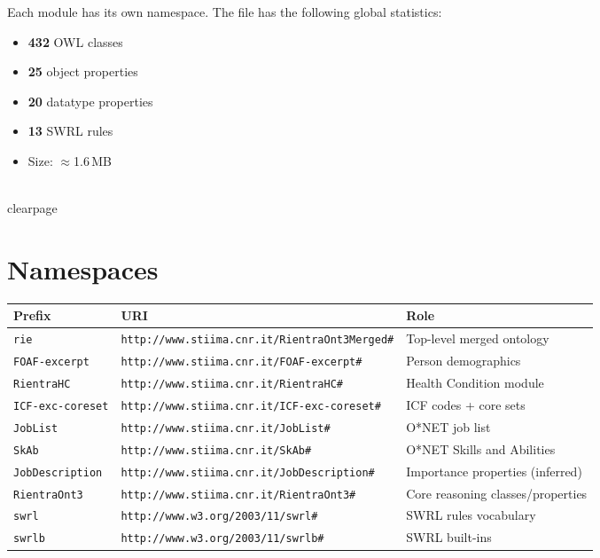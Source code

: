 ﻿\documentclass[12pt,a4paper]{article}
\begin{document}
\noindent Each module has its own namespace. The file has the following global statistics:
\begin{itemize}
  \item \textbf{432} OWL classes
  \item \textbf{25} object properties
  \item \textbf{20} datatype properties
  \item \textbf{13} SWRL rules
  \item Size: $\approx$1.6\,MB
\end{itemize}

\\clearpage
\section{Namespaces}

\begin{longtable}{@{}lll@{}}
\toprule
\textbf{Prefix} & \textbf{URI} & \textbf{Role} \\
\midrule
\endhead
\texttt{rie} & \texttt{http://www.stiima.cnr.it/RientraOnt3Merged\#} & Top-level merged ontology \\
\texttt{FOAF-excerpt} & \texttt{http://www.stiima.cnr.it/FOAF-excerpt\#} & Person demographics \\
\texttt{RientraHC} & \texttt{http://www.stiima.cnr.it/RientraHC\#} & Health Condition module \\
\texttt{ICF-exc-coreset} & \texttt{http://www.stiima.cnr.it/ICF-exc-coreset\#} & ICF codes + core sets \\
\texttt{JobList} & \texttt{http://www.stiima.cnr.it/JobList\#} & O*NET job list \\
\texttt{SkAb} & \texttt{http://www.stiima.cnr.it/SkAb\#} & O*NET Skills and Abilities \\
\texttt{JobDescription} & \texttt{http://www.stiima.cnr.it/JobDescription\#} & Importance properties (inferred) \\
\texttt{RientraOnt3} & \texttt{http://www.stiima.cnr.it/RientraOnt3\#} & Core reasoning classes/properties \\
\texttt{swrl} & \texttt{http://www.w3.org/2003/11/swrl\#} & SWRL rules vocabulary \\
\texttt{swrlb} & \texttt{http://www.w3.org/2003/11/swrlb\#} & SWRL built-ins \\
\bottomrule
\end{longtable}
\end{document}
